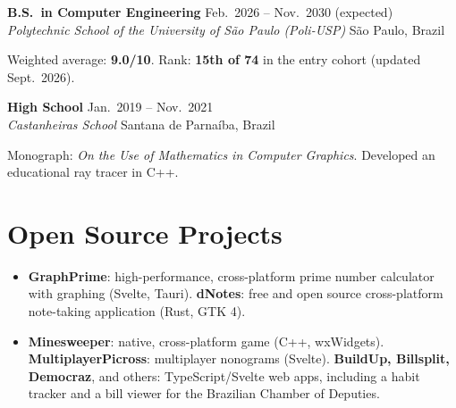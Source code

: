 \documentclass[10pt,a4paper]{article}
\newcommand{\entry}[4]{%
  \textbf{#1} \hfill {\small #3}\\
  {\itshape\color{subgray} #2} \hfill {\small\color{subgray}#4}\par
}
\begin{document}
\entry{B.S.\ in Computer Engineering}{Polytechnic School of the University of São Paulo (Poli-USP)}{Feb.\ 2026 -- Nov.\ 2030 (expected)}{São Paulo, Brazil}
{\small Weighted average: \textbf{9.0/10}. Rank: \textbf{15th of 74} in the entry cohort (updated Sept.\ 2026).}\par
\vspace{2pt}
\entry{High School}{Castanheiras School}{Jan.\ 2019 -- Nov.\ 2021}{Santana de Parnaíba, Brazil}
{\small Monograph: \textit{On the Use of Mathematics in Computer Graphics}. Developed an educational ray tracer in C++.}\par

\section{Open Source Projects}
\begin{itemize}
  \item \textbf{GraphPrime}: high-performance, cross-platform prime number calculator with graphing (Svelte, Tauri). \textbf{dNotes}: free and open source cross-platform note-taking application (Rust, GTK 4).
  \item \textbf{Minesweeper}: native, cross-platform game (C++, wxWidgets). \textbf{MultiplayerPicross}: multiplayer nonograms (Svelte). \textbf{BuildUp, Billsplit, Democraz}, and others: TypeScript/Svelte web apps, including a habit tracker and a bill viewer for the Brazilian Chamber of Deputies.
\end{itemize}

\end{document}
